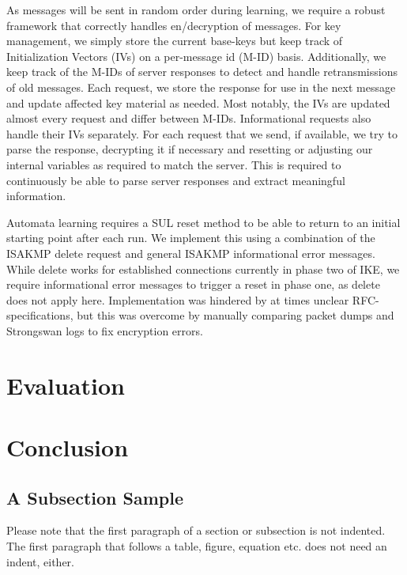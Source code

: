 \documentclass[runningheads]{llncs}
\begin{document}
As messages will be sent in random order during learning, we require a robust framework that correctly handles en/decryption of messages. For key management, we simply store the current base-keys but keep track of Initialization Vectors (IVs) on a per-message id (M-ID) basis. Additionally, we keep track of the M-IDs of server responses to detect and handle retransmissions of old messages. Each request, we store the response for use in the next message and update affected key material as needed. Most notably, the IVs are updated almost every request and differ between M-IDs. Informational requests also handle their IVs separately. For each request that we send, if available, we try to parse the response, decrypting it if necessary and resetting or adjusting our internal variables as required to match the server. This is required to continuously be able to parse server responses and extract meaningful information.

Automata learning requires a SUL reset method to be able to return to an initial starting point after each run. We implement this using a combination of the ISAKMP delete request and general ISAKMP informational error messages. While delete works for established connections currently in phase two of IKE, we require informational error messages to trigger a reset in phase one, as delete does not apply here. Implementation was hindered by at times unclear RFC-specifications, but this was overcome by manually comparing packet dumps and Strongswan logs to fix encryption errors.



\section{Evaluation} \label{chap:5} %
\section{Conclusion} \label{chap:6} %

\subsection{A Subsection Sample}
Please note that the first paragraph of a section or subsection is
not indented. The first paragraph that follows a table, figure,
equation etc. does not need an indent, either.
\end{document}
